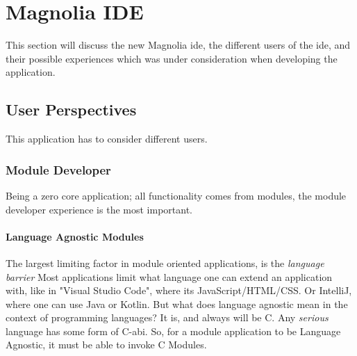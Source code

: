 \chapter{Magnolia IDE} \label{cha:ide}

This section will discuss the new Magnolia \gls{ide}, the different users of the
\gls{ide}, and their possible experiences which was under consideration when
developing the application.

\section{User Perspectives}

This application has to consider different users.

\subsection{Module Developer}

Being a zero core application; all functionality comes from modules, the module
developer experience is the most important.

\subsubsection{Language Agnostic Modules}

The largest limiting factor in module oriented applications, is the
\textit{language barrier} Most applications limit what language one can extend
an application with, like in "Visual Studio Code", where its
JavaScript/HTML/CSS. Or IntelliJ, where one can use Java or Kotlin. But what
does language agnostic mean in the context of programming languages? It is, and
always will be C. Any \textit{serious} language has some form of C-\gls{abi}.
So, for a module application to be Language Agnostic, it must be able to invoke
C Modules.

\begin{figure}
  \begin{center}
    
    \label{fig:fm1}
  \end{center}
\end{figure}

\begin{figure}
  \begin{center}
    
    \label{fig:fm2}
  \end{center}
\end{figure}

